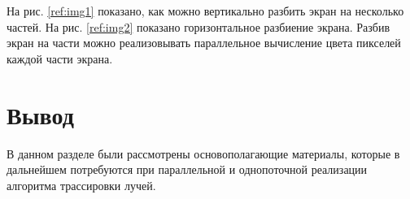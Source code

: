 На рис. \ref{ref:img1} показано, как можно вертикально разбить экран на 
несколько частей. На рис. \ref{ref:img2} показано горизонтальное разбиение экрана.
Разбив экран на части можно реализовывать параллельное вычисление цвета 
пикселей каждой части экрана.

\begin{figure}[ht!]
\end{figure}

\begin{figure}[ht!]
\end{figure}

\section{Вывод}

В данном разделе были рассмотрены
основополагающие материалы, которые в дальнейшем потребуются
при параллельной и однопоточной реализации алгоритма трассировки лучей.  
